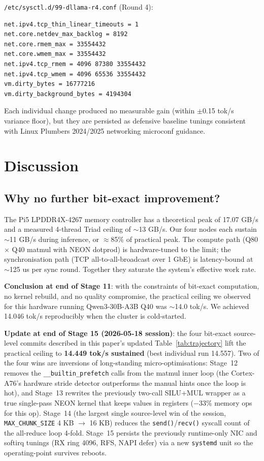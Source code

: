\documentclass[10pt,a4paper]{article}
\begin{document}
\texttt{/etc/sysctl.d/99-dllama-r4.conf} (Round 4):

\begin{lstlisting}
net.ipv4.tcp_thin_linear_timeouts = 1
net.core.netdev_max_backlog = 8192
net.core.rmem_max = 33554432
net.core.wmem_max = 33554432
net.ipv4.tcp_rmem = 4096 87380 33554432
net.ipv4.tcp_wmem = 4096 65536 33554432
vm.dirty_bytes = 16777216
vm.dirty_background_bytes = 4194304
\end{lstlisting}

Each individual change produced no measurable gain (within $\pm$0.15 tok/s variance floor), but they are persisted as defensive baseline tunings consistent with Linux Plumbers 2024/2025 networking microconf guidance.

\section{Discussion}

\subsection{Why no further bit-exact improvement?}

The Pi5 LPDDR4X-4267 memory controller has a theoretical peak of 17.07 GB/s and a measured 4-thread Triad ceiling of $\sim$13 GB/s. Our four nodes each sustain $\sim$11 GB/s during inference, or $\approx$85\% of practical peak. The compute path (Q80 $\times$ Q40 matmul with NEON dotprod) is hardware-tuned to the limit; the synchronisation path (TCP all-to-all-broadcast over 1 GbE) is latency-bound at $\sim$125 us per sync round. Together they saturate the system's effective work rate.

\textbf{Conclusion at end of Stage 11}: with the constraints of bit-exact computation, no kernel rebuild, and no quality compromise, the practical ceiling we observed for this hardware running Qwen3-30B-A3B Q40 was $\sim$14.0 tok/s. We achieved 14.046 tok/s reproducibly when the cluster is cold-started.

\textbf{Update at end of Stage 15 (2026-05-18 session)}: the four bit-exact source-level commits described in this paper's updated Table~\ref{tab:trajectory} lift the practical ceiling to \textbf{14.449 tok/s sustained} (best individual run 14.557). Two of the four wins are inversions of long-standing micro-optimisations: Stage~12 removes the \texttt{\_\_builtin\_prefetch} calls from the matmul inner loop (the Cortex-A76's hardware stride detector outperforms the manual hints once the loop is hot), and Stage~13 rewrites the previously two-call SILU+MUL wrapper as a true single-pass NEON kernel that keeps values in registers ($-$33\% memory ops for this op). Stage~14 (the largest single source-level win of the session, \texttt{MAX\_CHUNK\_SIZE} 4 KB $\to$ 16 KB) reduces the \texttt{send()}/\texttt{recv()} syscall count of the all-reduce loop 4-fold. Stage~15 persists the previously runtime-only NIC and softirq tunings (RX ring 4096, RFS, NAPI defer) via a new \texttt{systemd} unit so the operating-point survives reboots.
\end{document}
